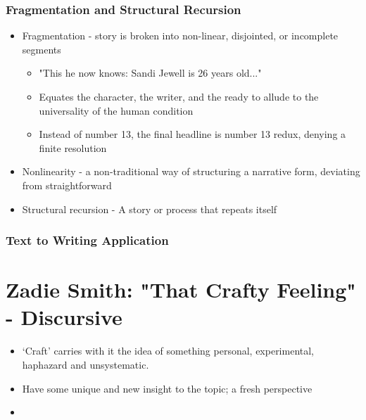 	\subsubsection{Fragmentation and Structural Recursion}
		
		\begin{itemize}
			\item Fragmentation - story is broken into non-linear, disjointed, or incomplete segments
				\begin{itemize}
					\item "This he now knows: Sandi Jewell is 26 years old..."
					\item Equates the character, the writer, and the ready to allude to the universality of the human condition
					\item Instead of number 13, the final headline is number 13 redux, denying a finite resolution
				\end{itemize}
			\item Nonlinearity - a non-traditional way of structuring a narrative form, deviating from straightforward
			\item Structural recursion - A story or process that repeats itself
		\end{itemize}
	
	\subsubsection{Text to Writing Application}

\section{Zadie Smith: "That Crafty Feeling" - Discursive}

	\begin{itemize}
		\item ‘Craft’ carries with it the idea of something personal, experimental, haphazard and unsystematic.
		\item Have some unique and new insight to the topic; a fresh perspective
		\item 
	\end{itemize}

